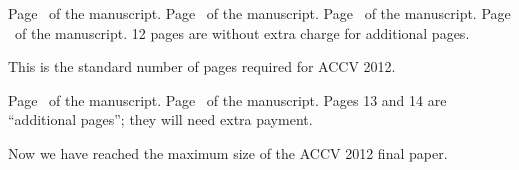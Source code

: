 \documentclass[runningheads]{llncs}
\begin{document}
\clearpage\mbox{}Page \thepage\ of the manuscript.
\clearpage\mbox{}Page \thepage\ of the manuscript.
\clearpage\mbox{}Page \thepage\ of the manuscript.
\clearpage\mbox{}Page \thepage\ of the manuscript.
12 pages are without extra charge for additional pages.
\par\vfill\par
This is the standard number of pages required for ACCV 2012.

\clearpage\mbox{}Page \thepage\ of the manuscript.
\clearpage\mbox{}Page \thepage\ of the manuscript.
Pages 13 and 14 are ``additional pages''; they will need extra payment.
\par\vfill\par
Now we have reached the maximum size of the ACCV 2012 final paper.
\end{document}

